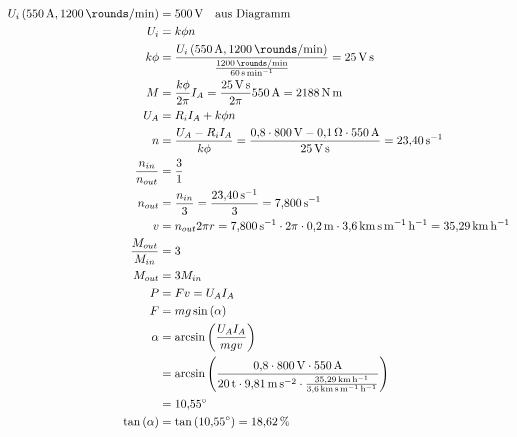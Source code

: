 \documentclass[11pt,a4paper]{scrartcl}
\newcommand{\mybr}[1]{\left(#1\right)}
\newcommand{\0}{_{\mybr{0}}}
\newcommand{\1}{_{\mybr{1}}}
\newcommand{\2}{_{\mybr{2}}}
\begin{document}
\subsection{}
\begin{align}
U_i\mybr{\SI{550}{\ampere},\SI{1200}{\rounds\per\minute}}&=\SI{500}{\volt}\quad\text{aus Diagramm}\\
U_i&=k\phi n\\
k\phi&=\frac{U_i\mybr{\SI{550}{\ampere},\SI{1200}{\rounds\per\minute}}}{\frac{\SI{1200}{\rounds\per\minute}}{\SI{60}{\second\per\minute}}}=\SI{25}{\volt\second}\\
M&=\frac{k\phi}{2\pi}I_A=\frac{\SI{25}{\volt\second}}{2\pi}\SI{550}{\ampere}=\SI{2188}{\newton\metre}\\
U_A&=R_i I_A +k \phi n\\
n&=\frac{U_A-R_i I_A}{k\phi}=\frac{\num{0.8}\cdot\SI{800}{\volt}-\SI{0.1}{\ohm}\cdot\SI{550}{\ampere}}{\SI{25}{\volt\second}}=\SI{23.40}{\per\second}\\
\frac{n_{in}}{n_{out}}&=\frac{3}{1}\\
n_{out}&=\frac{n_{in}}{3}=\frac{\SI{23.40}{\per\second}}{3}=\SI{7.800}{\per\second}\\
v&=n_{out}2\pi r=\SI{7.800}{\per\second}\cdot 2 \pi \cdot \SI{0.2}{\metre}\cdot\SI{3.6}{\kilo\metre\second\per\metre\per\hour}=\SI{35.29}{\kilo\metre\per\hour}\\
\frac{M_{out}}{M_{in}}&=3\\
M_{out}&=3M_{in}\\
P&=Fv=U_A I_A\\
F&=mg\sin\mybr{\alpha}\\
\alpha&=\arcsin\mybr{\frac{U_A I_A}{m g v}}\\
&=\arcsin\mybr{\frac{\num{0.8}\cdot\SI{800}{\volt}\cdot\SI{550}{\ampere}}{\SI{20}{\tonne}\cdot\SI{9.81}{\metre\per\second\squared}\cdot\frac{\SI{35.29}{\kilo\metre\per\hour}}{\SI{3.6}{\kilo\metre\second\per\metre\per\hour}}}}\\
&=\SI{10.55}{\degree}\\
\tan\mybr{\alpha}&=\tan\mybr{\SI{10.55}{\degree}}=\SI{18.62}{\percent}
\end{align}
\end{document}
